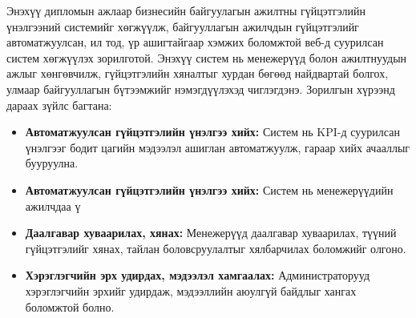 Энэхүү дипломын ажлаар бизнесийн байгуулагын ажилтны гүйцэтгэлийн үнэлгээний системийг хөгжүүлж, байгууллагын ажилчдын гүйцэтгэлийг автоматжуулсан, ил тод, үр ашигтайгаар хэмжих боломжтой веб-д суурилсан систем хөгжүүлэх зорилготой. Энэхүү систем нь менежерүүд болон ажилтнуудын ажлыг хөнгөвчилж, гүйцэтгэлийн хяналтыг хурдан бөгөөд найдвартай болгох, улмаар байгууллагын бүтээмжийг нэмэгдүүлэхэд чиглэгдэнэ. Зорилгын хүрээнд дараах зүйлс багтана:
\begin{itemize}
    \item \textbf{Автоматжуулсан гүйцэтгэлийн үнэлгээ хийх:} Систем нь KPI-д суурилсан үнэлгээг бодит цагийн мэдээлэл ашиглан автоматжуулж, гараар хийх ачааллыг бууруулна.
    \item \textbf{Автоматжуулсан гүйцэтгэлийн үнэлгээ хийх:} Систем нь менежерүүдийн ажилчдаа ү
    \item \textbf{Даалгавар хуваарилах, хянах:} Менежерүүд даалгавар хуваарилах, түүний гүйцэтгэлийг хянах, тайлан боловсруулалтыг хялбарчилах боломжийг олгоно.
    \item \textbf{Хэрэглэгчийн эрх удирдах, мэдээлэл хамгаалах:} Администраторууд хэрэглэгчийн эрхийг удирдаж, мэдээллийн аюулгүй байдлыг хангах боломжтой болно.
\end{itemize}